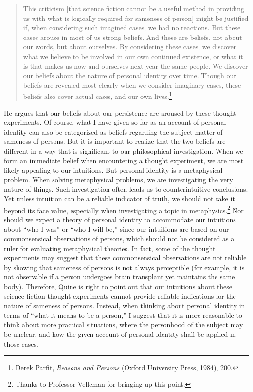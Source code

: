 \begin{quote}
This criticism [that science fiction cannot be a useful method in
providing us with what is logically required for sameness of person]
might be justified if, when considering such imagined cases, we had no
reactions. But these cases arouse in most of us strong beliefs. And
these are beliefs, not about our words, but about ourselves. By
considering these cases, we discover what we believe to be involved in
our own continued existence, or what it is that makes us now and
ourselves next year the same people. We discover our beliefs about the
nature of personal identity over time. Though our beliefs are revealed
most clearly when we consider imaginary cases, these beliefs also cover
actual cases, and our own lives.\footnote{Derek Parfit, \emph{Reasons
  and Persons} (Oxford University Press, 1984), 200.}
\end{quote}

He argues that our beliefs about our persistence are aroused by these
thought experiments. Of course, what I have given so far as an account
of personal identity can also be categorized as beliefs regarding the
subject matter of sameness of persons. But it is important to realize
that the two beliefs are different in a way that is significant to our
philosophical investigation. When we form an immediate belief when
encountering a thought experiment, we are most likely appealing to our
intuitions. But personal identity is a metaphysical problem. When
solving metaphysical problems, we are investigating the very nature of
things. Such investigation often leads us to counterintuitive
conclusions. Yet unless intuition can be a reliable indicator of truth,
we should not take it beyond its face value, especially when
investigating a topic in metaphysics.\footnote{Thanks to Professor
  Velleman for bringing up this point.} Nor should we expect a theory of
personal identity to accommodate our intuitions about ``who I was'' or
``who I will be,'' since our intuitions are based on our commonsensical
observations of persons, which should not be considered as a ruler for
evaluating metaphysical theories. In fact, some of the thought
experiments may suggest that these commonsensical observations are not
reliable by showing that sameness of persons is not always perceptible (for example, it is not observable if a person undergoes brain
transplant yet maintains the same body). Therefore, Quine is right to
point out that our intuitions about these science fiction thought
experiments cannot provide reliable indications for the nature of
sameness of persons. Instead, when thinking about personal identity in
terms of ``what it means to be a person,'' I suggest that it is more
reasonable to think about more practical situations, where the
personhood of the subject may be unclear, and how the given account of
personal identity shall be applied in those cases.

